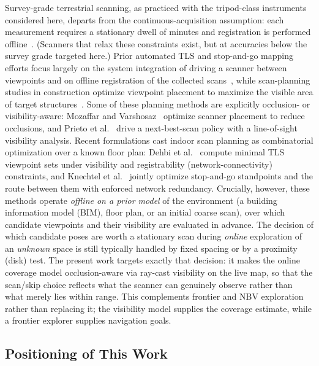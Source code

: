 \documentclass[sensors,article,submit,pdftex,moreauthors]{Definitions/mdpi}
\begin{document}
Survey-grade terrestrial scanning, as practiced with the tripod-class
instruments considered here, departs from the continuous-acquisition
assumption: each measurement requires a stationary dwell of minutes and
registration is performed offline~\cite{stopandgo-review}. (Scanners that
relax these constraints exist, but at accuracies below the survey grade
targeted here.) Prior automated TLS
and stop-and-go mapping efforts focus largely on the system integration of
driving a scanner between viewpoints and on offline registration of the
collected scans~\cite{stopandgo-registration}, while scan-planning studies in
construction optimize viewpoint placement to maximize the visible area of target
structures~\cite{tls-scanplanning}. Some of these planning methods are
explicitly occlusion- or visibility-aware: Mozaffar and
Varshosaz~\cite{mozaffar2016occlusion} optimize scanner placement to reduce
occlusions, and Prieto et al.~\cite{prieto2017nbs} drive a next-best-scan
policy with a line-of-sight visibility analysis. Recent formulations cast
indoor scan planning as combinatorial optimization over a known floor plan:
Dehbi et al.~\cite{dehbi2021} compute minimal TLS viewpoint sets under
visibility and registrability (network-connectivity) constraints, and Knechtel
et al.~\cite{knechtel2025} jointly optimize stop-and-go standpoints and the
route between them with enforced network redundancy. Crucially, however, these
methods operate \emph{offline on a prior model} of the environment (a building
information model (BIM), floor plan, or an initial coarse scan), over which
candidate viewpoints and their visibility are evaluated in advance. The decision of which candidate poses are worth a
stationary scan during \emph{online} exploration of an \emph{unknown} space is
still typically handled by fixed spacing or by a proximity (disk) test. The
present work targets exactly that decision: it makes the online coverage model
occlusion-aware via ray-cast visibility on the live map, so that the scan/skip
choice reflects what the scanner can genuinely observe rather than what merely
lies within range. This complements frontier and NBV exploration rather than
replacing it; the visibility model supplies the coverage estimate, while a
frontier explorer supplies navigation goals.

\subsection{Positioning of This Work}
\end{document}
